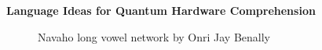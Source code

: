 \begin{center}
\Large\textbf{Language Ideas for Quantum Hardware Comprehension}
\end{center}

\large{
\begin{figure}[htbp]
    \centering
    
    \caption{Navaho long vowel network by Onri Jay Benally}
    \label{fig:svgImage}
\end{figure}
}